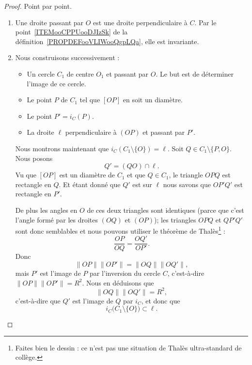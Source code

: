 \begin{proof}
    Point par point.
    \begin{enumerate}
        \item
            Une droite passant par \( O\) est une droite perpendiculaire à \( C\). Par le point~\ref{ITEMooCPPUooDJIzSk} de la définition~\ref{PROPDEFooVLIWooQgpLQa}, elle est invariante.
        \item
            Nous construisons successivement :
            \begin{itemize}
                \item
                    Un cercle \( C_1\) de centre \( O_1\) et passant par \( O\). Le but est de déterminer l'image de ce cercle.
                \item
                    Le point \( P\) de \( C_1\) tel que \( [OP]\) en soit un diamètre.
                \item
                    Le point \( P'=i_C(P)\).
                \item
                    La droite \( \ell\) perpendiculaire à \( (OP)\) et passant par \( P'\).
            \end{itemize}
            Nous montrons maintenant que \( i_C(C_1\setminus\{ O \})=\ell\). Soit \( Q\in C_1\setminus\{ P,O \}\). Nous posons
            \begin{equation}
                Q'=(QO)\cap \ell.
            \end{equation}
            Vu que \( [OP]\) est un diamètre de \( C_1\) et que \( Q\in C_1\), le triangle \( OPQ\) est rectangle en \( Q\). Et étant donné que \( Q'\) est sur \( \ell\) nous savons que \( OP'Q'\) est rectangle en \( P'\).

            De plus les angles en \( O\) de ces deux triangles sont identiques (parce que c'est l'angle formé par les droites \( (OQ) \) et \( (OP)\)); les triangles \( OPQ\) et \( QP'Q'\) sont donc semblables et nous pouvons utiliser le théorème de Thalès\footnote{Faites bien le dessin : ce n'est pas une situation de Thalès ultra-standard de collège.} :
            \begin{equation}
                \frac{ OP }{ OQ }=\frac{ OQ' }{ OP' }.
            \end{equation}
            Donc
            \begin{equation}
                \| OP \|\| OP' \|=\| OQ \|\| OQ' \|,
            \end{equation}
            mais \( P'\) est l'image de \( P\) par l'inversion du cercle \( C\), c'est-à-dire \( \| OP \|\| OP' \|=R^2\). Nous en déduisons que
            \begin{equation}
                \| OQ \| \| OQ' \|=R^2,
            \end{equation}
            c'est-à-dire que \( Q'\) est l'image de \( Q\) par \( i_C\), et donc que
            \begin{equation}        \label{EQooPJBGooGeIVQQ}
                i_C\big( C_1\setminus\{ O \} \big)\subset \ell.
            \end{equation}


\end{enumerate}
\end{proof}
